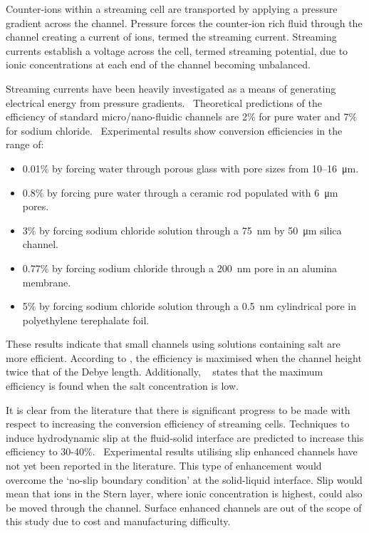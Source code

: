 \documentclass[10pt,final,journal]{IEEEtran}
\begin{document}
    Counter-ions within a streaming cell are transported by applying a pressure gradient across the channel.
    Pressure forces the counter-ion rich fluid through the channel creating a current of ions, termed the streaming current.
    Streaming currents establish a voltage across the cell, termed streaming potential, due to ionic concentrations at each end of the channel becoming unbalanced.

    Streaming currents have been heavily investigated as a means of generating electrical energy from pressure gradients.~\cite{Chang2009,Daiguji2006,Daiguji2004b,Davidson2008a,Davidson2008,CherngHon2012,Jiao2014,Lu2006,Olthuis2005,Osterle1964,Pennathur2007,Ren2008a,VanderHeyden2006,Heyden2007,Xie2008,Yang2003}
    Theoretical predictions of the efficiency of standard micro/nano-fluidic channels are 2\% for pure water and 7\% for sodium chloride.~\cite{VanderHeyden2006}
    Experimental results show conversion efficiencies in the range of:
    \begin{itemize}
        \item 0.01\% by forcing water through porous glass with pore sizes from 10\thinspace--\SI{16}{\micro\metre}.~\cite{Yang2003}
        \item 0.8\% by forcing pure water through a ceramic rod populated with \SI{6}{\micro\metre} pores.~\cite{Yang2004}
        \item 3\% by forcing sodium chloride solution through a \SI{75}{\nano\metre} by \SI{50}{\micro\metre} silica channel.~\cite{Heyden2007}
        \item 0.77\% by forcing sodium chloride through a \SI{200}{\nano\metre} pore in an alumina membrane.~\cite{Lu2006}
        \item 5\% by forcing sodium chloride solution through a \SI{0.5}{\nano\metre} cylindrical pore in polyethylene terephalate foil.~\cite{Xie2008}
    \end{itemize}
    These results indicate that small channels using solutions containing salt are more efficient.
    According to \cite{Daiguji2004b}, the efficiency is maximised when the channel height twice that of the Debye length.
    Additionally, ~\cite{VanderHeyden2006} states that the maximum efficiency is found when the salt concentration is low.


    It is clear from the literature that there is significant progress to be made with respect to increasing the conversion efficiency of streaming cells.
    Techniques to induce hydrodynamic slip at the fluid-solid interface are predicted to increase this efficiency to 30-40\%.~\cite{Davidson2008a, Ren2008a}
    Experimental results utilising slip enhanced channels have not yet been reported in the literature.
    This type of enhancement would overcome the `no-slip boundary condition' at the solid-liquid interface.
    Slip would mean that ions in the Stern layer, where ionic concentration is highest, could also be moved through the channel.
    Surface enhanced channels are out of the scope of this study due to cost and manufacturing difficulty.
\end{document}
